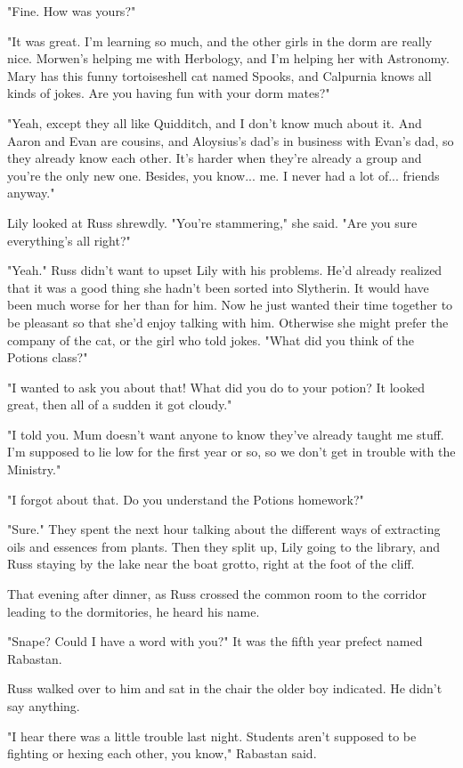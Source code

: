 \documentclass[a4paper,11pt]{article}
\begin{document}
"Fine. How was yours?"

"It was great. I'm learning so much, and the other girls in the dorm are really nice. Morwen's helping me with Herbology, and I'm helping her with Astronomy. Mary has this funny tortoiseshell cat named Spooks, and Calpurnia knows all kinds of jokes. Are you having fun with your dorm mates?"

"Yeah, except they all like Quidditch, and I don't know much about it. And Aaron and Evan are cousins, and Aloysius's dad's in business with Evan's dad, so they already know each other. It's harder when they're already a group and you're the only new one. Besides, you know... me. I never had a lot of... friends anyway."

Lily looked at Russ shrewdly. "You're stammering," she said. "Are you sure everything's all right?"

"Yeah." Russ didn't want to upset Lily with his problems. He'd already realized that it was a good thing she hadn't been sorted into Slytherin. It would have been much worse for her than for him. Now he just wanted their time together to be pleasant so that she'd enjoy talking with him. Otherwise she might prefer the company of the cat, or the girl who told jokes. "What did you think of the Potions class?"

"I wanted to ask you about that! What did you do to your potion? It looked great, then all of a sudden it got cloudy."

"I told you. Mum doesn't want anyone to know they've already taught me stuff. I'm supposed to lie low for the first year or so, so we don't get in trouble with the Ministry."

"I forgot about that. Do you understand the Potions homework?"

"Sure." They spent the next hour talking about the different ways of extracting oils and essences from plants. Then they split up, Lily going to the library, and Russ staying by the lake near the boat grotto, right at the foot of the cliff.

That evening after dinner, as Russ crossed the common room to the corridor leading to the dormitories, he heard his name.

"Snape? Could I have a word with you?" It was the fifth year prefect named Rabastan.

Russ walked over to him and sat in the chair the older boy indicated. He didn't say anything.

"I hear there was a little trouble last night. Students aren't supposed to be fighting or hexing each other, you know," Rabastan said.
\end{document}

